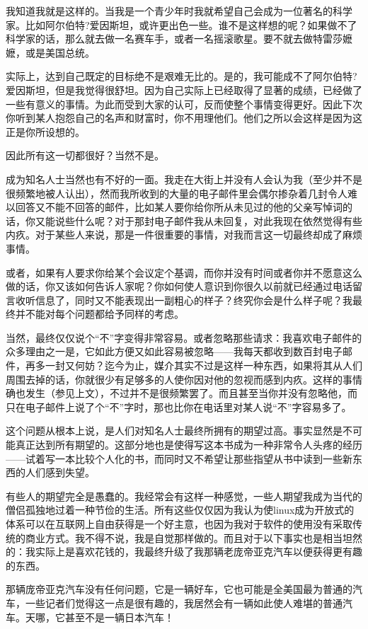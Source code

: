 我知道我就是这样的。当我是一个青少年时我就希望自己会成为一位著名的科学家。比如阿尔伯特?爱因斯坦，或许更出色一些。谁不是这样想的呢？如果做不了科学家的话，那么就去做一名赛车手，或者一名摇滚歌星。要不就去做特雷莎嬷嬷，或是美国总统。

实际上，达到自己既定的目标绝不是艰难无比的。是的，我可能成不了阿尔伯特?爱因斯坦，但是我觉得很舒坦。因为自己实际上已经取得了显著的成绩，已经做了一些有意义的事情。为此而受到大家的认可，反而使整个事情变得更好。因此下次你听到某人抱怨自己的名声和财富时，你不用理他们。他们之所以会这样是因为这正是你所设想的。

因此所有这一切都很好？当然不是。

成为知名人士当然也有不好的一面。我走在大街上并没有人会认为我（至少并不是很频繁地被人认出），然而我所收到的大量的电子邮件里会偶尔掺杂着几封令人难以回答又不能不回答的邮件，比如某人要你给你所从未见过的他的父亲写悼词的话，你又能说些什么呢？对于那封电子邮件我从未回复，对此我现在依然觉得有些内疚。对于某些人来说，那是一件很重要的事情，对我而言这一切最终却成了麻烦事情。

或者，如果有人要求你给某个会议定个基调，而你并没有时间或者你并不愿意这么做的话，你又该如何告诉人家呢？你如何使人意识到你很久以前就已经通过电话留言收听信息了，同时又不能表现出一副粗心的样子？终究你会是什么样子呢？我最终并不能对每个问题都给予同样的考虑。

当然，最终仅仅说个“不”字变得非常容易。或者忽略那些请求：我喜欢电子邮件的众多理由之一是，它如此方便又如此容易被忽略——我每天都收到数百封电子邮件，再多一封又何妨？迄今为止，媒介其实不过是这样一种东西，如果将其从人们周围去掉的话，你就很少有足够多的人使你因对他的忽视而感到内疚。这样的事情确也发生（参见上文），不过并不是很频繁罢了。而且甚至当你并没有忽略他，而只在电子邮件上说了个“不”字时，那也比你在电话里对某人说“不”字容易多了。

这个问题从根本上说，是人们对知名人士最终所拥有的期望过高。事实显然是不可能真正达到所有期望的。这部分地也是使得写这本书成为一种非常令人头疼的经历——试着写一本比较个人化的书，而同时又不希望让那些指望从书中读到一些新东西的人们感到失望。

有些人的期望完全是愚蠢的。我经常会有这样一种感觉，一些人期望我成为当代的僧侣孤独地过着一种节俭的生活。所有这些仅仅因为我认为使linux成为开放式的体系可以在互联网上自由获得是一个好主意，也因为我对于软件的使用没有采取传统的商业方式。我不得不说，我是自觉那样做的。而且对于以下事实也是相当坦然的：我实际上是喜欢花钱的，我最终升级了我那辆老庞帝亚克汽车以便获得更有趣的东西。

那辆庞帝亚克汽车没有任何问题，它是一辆好车，它也可能是全美国最为普通的汽车，一些记者们觉得这一点是很有趣的，我居然会有一辆如此使人难堪的普通汽车。天哪，它甚至不是一辆日本汽车！

